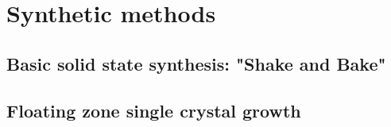 \chapter{Synthetic methods} \label{chap:chap-2}





\section{Basic solid state synthesis: "Shake and Bake"}

\section{Floating zone single crystal growth}

